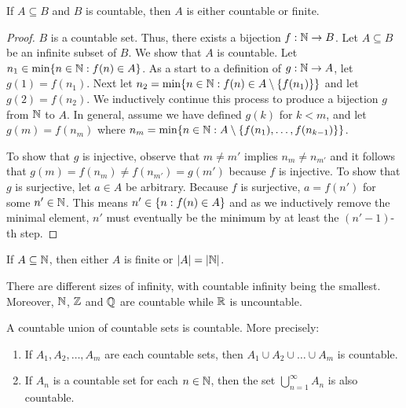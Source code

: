 \begin{theorem}
  If $A \subseteq B$ and $B$ is countable, then $A$ is either
  countable or finite.
\end{theorem}

\begin{proof}
  $B$ is a countable set. Thus, there exists a bijection $f : \mathbb N \to
  B$. Let $A \subseteq B$ be an infinite subset of $B$. We show that
  $A$ is countable. Let $n_1 \in \min\{ n \in \mathbb N : f(n) \in A \}$.
  As a start to a definition of $g : \mathbb N \to A$, let $g(1) = f(n_1)$.
  Next let $n_2 = \min\{ n \in \mathbb N : f(n) \in A \setminus
  \{ f(n_1) \} \}$ and let $g(2) = f(n_2)$. We inductively continue
  this process to produce a bijection $g$ from $\mathbb N$ to $A$. In
  general, assume we have defined $g(k)$ for $k < m$, and let $g(m) =
  f(n_m)$ where $n_m = \min\{ n \in \mathbb N : A \setminus \{ f(n_1),
  \dots, f(n_{k - 1}) \} \}$.

  To show that $g$ is injective, observe that $m \neq m'$ implies
  $n_m \neq n_{m'}$ and it follows that $g(m) = f(n_m) \neq f(n_{m'})
  = g(m')$ because $f$ is injective. To show that $g$ is surjective,
  let $a \in A$ be arbitrary. Because $f$ is surjective, $a = f(n')$
  for some $n' \in \mathbb N$. This means $n' \in \{ n : f(n) \in A \}$ and
  as we inductively remove the minimal element, $n'$ must eventually
  be the minimum by at least the $(n' -1)$-th step.
\end{proof}

\begin{corollary}
  If $A \subseteq \mathbb N$, then either $A$ is finite or $| A | = | \mathbb N |$.
\end{corollary}

\begin{corollary}
  There are different sizes of infinity, with countable infinity
  being the smallest. Moreover, $\mathbb N$, $\mathbb Z$ and $\mathbb Q$ are countable
  while $\mathbb R$ is uncountable.
\end{corollary}

\begin{theorem}
  A countable union of countable sets is countable. More precisely:
  \begin{enumerate}
    \item If $A_1, A_2, \dots, A_m$ are each countable sets, then
      $A_1 \cup A_2 \cup \dots \cup A_m$ is countable.
    \item If $A_n$ is a countable set for each $n \in \mathbb N$, then the
      set $\bigcup_{n = 1}^{\infty} A_n$ is also countable.
  \end{enumerate}
\end{theorem}

